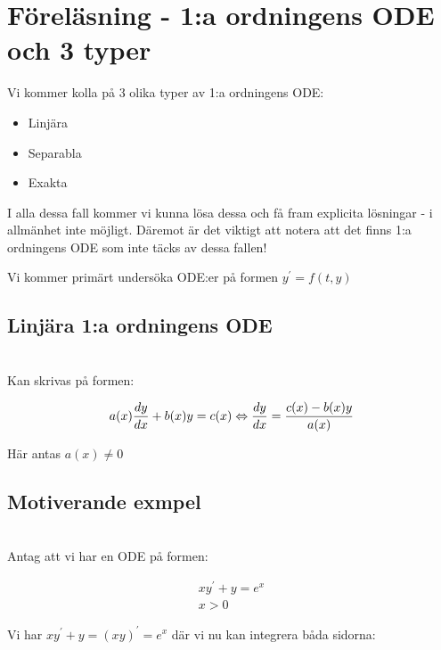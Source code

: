 \section{Föreläsning - 1:a ordningens ODE och 3 typer}

\noindent Vi kommer kolla på 3 olika typer av 1:a ordningens ODE:
\par\bigskip
\begin{itemize}
  \item Linjära
  \item Separabla
  \item Exakta
\end{itemize}
\par\bigskip
\noindent I alla dessa fall kommer vi kunna lösa dessa och få fram explicita lösningar - i allmänhet inte möjligt. Däremot är det viktigt att notera att det finns 1:a ordningens ODE som inte täcks av dessa fallen!
\par\bigskip
\noindent Vi kommer primärt undersöka ODE:er på formen $y^{\prime}=f(t,y)$
\par\bigskip
\subsection{Linjära 1:a ordningens ODE}\hfill\\

\noindent Kan skrivas på formen:
\par\bigskip

\begin{equation*}
  \begin{gathered}
    a(x)\dfrac{dy}{dx}+b(x)y=c(x) \Leftrightarrow \dfrac{dy}{dx}=\dfrac{c(x)-b(x)y}{a(x)}
  \end{gathered}
\end{equation*}
\par\bigskip
\noindent Här antas $a(x)\neq 0$

\subsection{Motiverande exmpel}\hfill\\

\noindent Antag att vi har en ODE på formen:


\begin{equation*}
  \begin{gathered}
    xy^{\prime}+y=e^x\\
    x>0
  \end{gathered}
\end{equation*}
\par\bigskip
\noindent Vi har $xy^{\prime}+y=(xy)^{\prime} = e^x$ där vi nu kan integrera båda sidorna:
\par\bigskip


